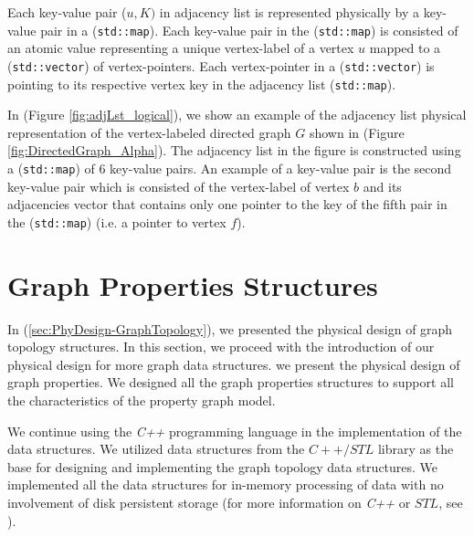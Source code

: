 {Each key-value pair ($u,K)$ in adjacency list is represented physically by a key-value pair in a (\texttt{std::map}). Each key-value pair in the (\texttt{std::map}) is consisted of an atomic value representing a unique vertex-label of a vertex $u$ mapped to a (\texttt{std::vector}) of vertex-pointers. Each vertex-pointer in a (\texttt{std::vector}) is pointing to its respective vertex key in the adjacency list (\texttt{std::map}).


In (Figure \ref{fig:adjLst_logical}), we show an example of the adjacency list physical representation of the vertex-labeled directed graph $G$ shown in (Figure \ref{fig:DirectedGraph_Alpha}). The adjacency list in the figure is constructed using a (\texttt{std::map}) of 6 key-value pairs. An example of a key-value pair is the second key-value pair which is consisted of the vertex-label of vertex $b$ and its adjacencies vector that contains only one pointer to the key of the fifth pair in the (\texttt{std::map}) (i.e. a pointer to vertex $f$).

\section{Graph Properties Structures}
\label{sec:PhyDesign-GraphProperties}

In (\ref{sec:PhyDesign-GraphTopology}), we presented the physical design of graph topology structures. In this section, we proceed with the introduction of our physical design for more graph data structures. we present the physical design of graph properties. We designed all the graph properties structures to support all the characteristics of the property graph model. 

We continue using the \textit{C++} programming language in the implementation of the data structures. We utilized data structures from the $C++/STL$ library as the base for designing and implementing the graph topology data structures. We implemented all the data structures for in-memory processing of data with no involvement of disk persistent storage (for more information on \textit{C++} or $STL$, see \cite{josuttis2012c++}).

}
